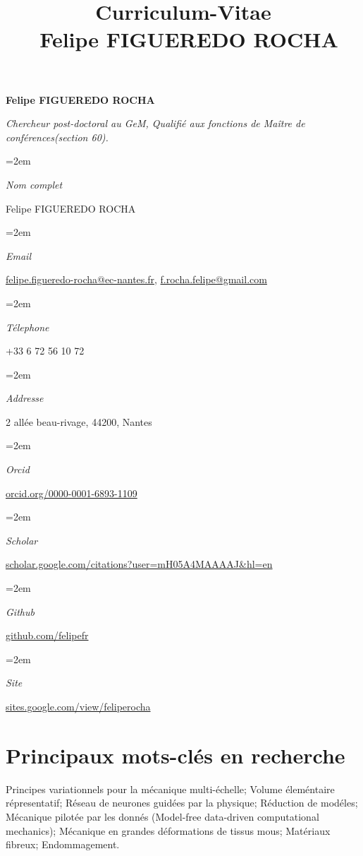 \documentclass[french]{article}
\title{\Large {\bf Curriculum-Vitae} \\ Felipe FIGUEREDO ROCHA}
\date{}
\newcommand{\sepspace}{\vspace*{1em}}
\newcommand{\name}[1]{
	\huge %
	\begin{center} \textbf{#1} \end{center}\par
	\normalsize\normalfont}
\newcommand{\motto}[1]{
	\large %
	\begin{center} \textsl{#1}\end{center}\par
	\normalsize \normalfont}
\newcommand{\info}[2]{
	\noindent\hangindent=2em\hangafter=0
	\parbox{60pt}{\textsl{#1}} %
		#2 \par
} %
\begin{document}

\name{Felipe FIGUEREDO ROCHA}
\vspace*{-10pt}
\motto{Chercheur post-doctoral au GeM,
Qualifié aux fonctions de Maître de conférences(section 60).}
\sepspace
\info{Nom complet}{Felipe FIGUEREDO ROCHA}
\info{Email}{\url{felipe.figueredo-rocha@ec-nantes.fr}, \url{f.rocha.felipe@gmail.com}}
\info{Télephone}{+33 6 72 56 10 72}
\info{Addresse}{2 allée beau-rivage, 44200, Nantes}
\info{Orcid}{\url{orcid.org/0000-0001-6893-1109}}
\info{Scholar}{\url{scholar.google.com/citations?user=mH05A4MAAAAJ&hl=en}}
\info{Github}{\url{github.com/felipefr}}
\info{Site}{\url{sites.google.com/view/feliperocha}}

\section*{Principaux mots-clés en recherche}
%
Principes variationnels pour la mécanique multi-échelle; Volume éleméntaire répresentatif; Réseau de neurones guidées par la physique; Réduction de modéles; Mécanique pilotée par les donnés (Model-free data-driven computational mechanics);  Mécanique en grandes déformations de tissus mous;  Matériaux fibreux; Endommagement.  
\end{document}
